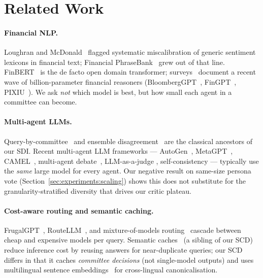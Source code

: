 \section{Related Work}
\label{sec:related}

\paragraph{Financial NLP.}
Loughran and McDonald~ flagged
systematic miscalibration of generic sentiment lexicons in financial
text; Financial PhraseBank~\cite{malo2014fpb} grew out of that line.
FinBERT~\cite{araci2019finbert,yang2020finbert} is the de facto open
domain transformer; surveys~\cite{wang2024finllmsurvey} document a
recent wave of billion-parameter financial reasoners
(BloombergGPT~\cite{wu2023bloomberggpt},
FinGPT~\cite{yang2023fingpt}, PIXIU~\cite{xie2023pixiu}). We ask
\emph{not} which model is best, but how small each agent in a
committee can become.

\paragraph{Multi-agent LLMs.}
Query-by-committee~\cite{settles2009al} and ensemble
disagreement~\cite{lakshminarayanan2017ensembles} are the classical
ancestors of our SDI. Recent multi-agent LLM frameworks ---
AutoGen~\cite{wu2023autogen}, MetaGPT~\cite{hong2023metagpt},
CAMEL~\cite{li2023camel}, multi-agent
debate~\cite{du2023debate,liang2023encouraging}, LLM-as-a-judge
\cite{zheng2023judging}, self-consistency
\cite{wang2023selfconsistency} --- typically use the \emph{same}
large model for every agent. Our negative result on same-size
persona vote (Section~\ref{sec:experiments:scaling}) shows this does
not substitute for the granularity-stratified diversity that drives
our critic plateau.

\paragraph{Cost-aware routing and semantic caching.}
FrugalGPT~\cite{chen2023frugalgpt}, RouteLLM~\cite{ong2024routellm},
and mixture-of-models routing~\cite{wang2022mixture,shnitzer2023llmrouting}
cascade between cheap and expensive models per query. Semantic
caches~\cite{wang2024caching} (a sibling of our SCD) reduce inference
cost by reusing answers for near-duplicate queries; our SCD differs
in that it caches \emph{committee decisions} (not single-model
outputs) and uses multilingual sentence
embeddings~\cite{reimers2019sbert,reimers2020multilingualkd} for
cross-lingual canonicalisation.
